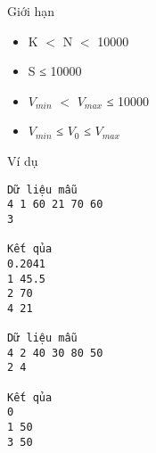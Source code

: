 Giới hạn  
\begin{itemize}
	\item     K $<$ N $<$ 10000   
	\item     S ≤ 10000   
	\item     $V_{min}$    $<$ $V_{max}$    ≤ 10000   
	\item     $V_{min}$    ≤ $V_{0}$    ≤ $V_{max}$
\end{itemize}
   Ví dụ  
\begin{verbatim}
Dữ liệu mẫu
4 1 60 21 70 60
3

Kết qủa
0.2041
1 45.5
2 70
4 21

Dữ liệu mẫu
4 2 40 30 80 50
2 4

Kết qủa
0
1 50
3 50
\end{verbatim}